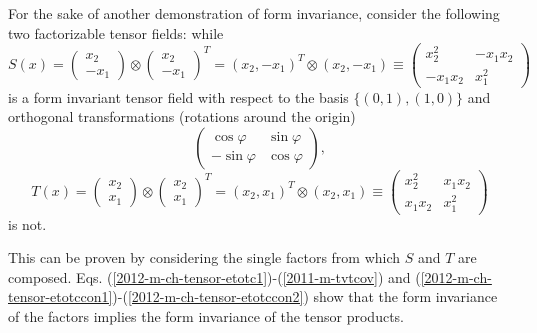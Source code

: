 {For the sake of another demonstration of form invariance, consider the following two factorizable tensor fields:
while
\begin{equation}
{S}(x)=
\begin{pmatrix}
  {  x}_2  \\
- {  x}_1
\end{pmatrix}
\otimes
\begin{pmatrix}
   {  x}_2  \\
 - {  x}_1
\end{pmatrix}^T
=
\left(    {  x}_2 ,- {  x}_1  \right)^T
\otimes
\left(    {  x}_2 ,- {  x}_1  \right)
\equiv
\begin{pmatrix}
   {  x}_2^2          & -{ x}_1{x}_2  \\
 - {  x}_1{  x}_2     & { x}_1^2
\end{pmatrix}
\label{2012-m-ch-tensor-etotccon1factorized}
\end{equation}
is a form invariant tensor field with respect to the basis $\{(0,1),(1,0)\}$
and orthogonal transformations (rotations around the origin)
\begin{equation}
\begin{pmatrix}
  \cos \varphi & \sin \varphi  \\
 -\sin \varphi & \cos \varphi
\end{pmatrix}
,
\end{equation}
\begin{equation}
{ T}(x)=
\begin{pmatrix}
{  x}_2  \\
{  x}_1
\end{pmatrix}
\otimes
\begin{pmatrix}
{  x}_2  \\
{  x}_1 \end{pmatrix}^T
=
\left(    {  x}_2 ,  {  x}_1  \right)^T
\otimes
\left(    {  x}_2 ,  {  x}_1  \right)
\equiv
\begin{pmatrix}
{  x}_2^2 & { x}_1{  x}_2  \\
{  x}_1{  x}_2          & { x}_1^2
\end{pmatrix}
\end{equation}
is not.

This can be proven by considering the single factors from which $S$ and $T$ are composed.
Eqs. (\ref{2012-m-ch-tensor-etotc1})-(\ref{2011-m-tvtcov})
and
(\ref{2012-m-ch-tensor-etotccon1})-(\ref{2012-m-ch-tensor-etotccon2})
show that the form
invariance of the factors implies the form invariance of the tensor products.

}
